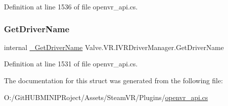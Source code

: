 Definition at line 1536 of file openvr\+\_\+api.\+cs.

\mbox{\label{struct_valve_1_1_v_r_1_1_i_v_r_driver_manager_a7d36f70366da7d42dba73393083c6cdd}} 
\subsubsection{\texorpdfstring{GetDriverName}{GetDriverName}}
{\footnotesize\ttfamily internal \mbox{\hyperlink{struct_valve_1_1_v_r_1_1_i_v_r_driver_manager_a57559315b7fa733ce6d229a0a09ebddb}{\+\_\+\+Get\+Driver\+Name}} Valve.\+V\+R.\+I\+V\+R\+Driver\+Manager.\+Get\+Driver\+Name}



Definition at line 1531 of file openvr\+\_\+api.\+cs.



The documentation for this struct was generated from the following file\+:\begin{DoxyCompactItemize}
\item 
O\+:/\+Git\+H\+U\+B\+M\+I\+N\+I\+P\+Roject/\+Assets/\+Steam\+V\+R/\+Plugins/\mbox{\hyperlink{openvr__api_8cs}{openvr\+\_\+api.\+cs}}\end{DoxyCompactItemize}
